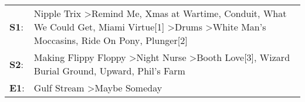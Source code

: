 \begin{supertabular}{p{0.03\textwidth}p{0.92\textwidth}}
 \textbf{S1}:  &  Nipple Trix\textsuperscript{} \textgreater \enspace Remind Me\textsuperscript{}, \enspace Xmas at Wartime\textsuperscript{}, \enspace Conduit\textsuperscript{}, \enspace What We Could Get\textsuperscript{}, \enspace Miami Virtue[1]\textsuperscript{} \textgreater \enspace Drums\textsuperscript{} \textgreater \enspace White Man's Moccasins\textsuperscript{}, \enspace Ride On Pony\textsuperscript{}, \enspace Plunger[2]\textsuperscript{}  \enspace  \\
 \textbf{S2}:  &                                                                                                                                                                           Making Flippy Floppy\textsuperscript{} \textgreater \enspace Night Nurse\textsuperscript{} \textgreater \enspace Booth Love[3]\textsuperscript{}, \enspace Wizard Burial Ground\textsuperscript{}, \enspace Upward\textsuperscript{}, \enspace Phil's Farm\textsuperscript{}  \enspace  \\
 \textbf{E1}:  &                                                                                                                                                                                                                                                                                                                                                                    Gulf Stream\textsuperscript{} \textgreater \enspace Maybe Someday\textsuperscript{}  \enspace  \\
\end{supertabular}
